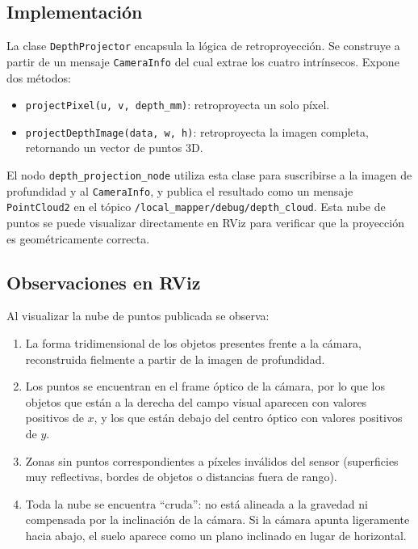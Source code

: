 \subsection{Implementación}

La clase \texttt{DepthProjector} encapsula la lógica de retroproyección.
Se construye a partir de un mensaje \texttt{CameraInfo} del cual extrae
los cuatro intrínsecos. Expone dos métodos:

\begin{itemize}
  \item \texttt{projectPixel(u, v, depth\_mm)}: retroproyecta un solo
        píxel.
  \item \texttt{projectDepthImage(data, w, h)}: retroproyecta la imagen
        completa, retornando un vector de puntos 3D.
\end{itemize}

El nodo \texttt{depth\_projection\_node} utiliza esta clase para suscribirse
a la imagen de profundidad y al \texttt{CameraInfo}, y publica el resultado
como un mensaje \texttt{PointCloud2} en el tópico
\texttt{/local\_mapper/debug/depth\_cloud}. Esta nube de puntos se puede
visualizar directamente en RViz para verificar que la proyección es
geométricamente correcta.

\subsection{Observaciones en RViz}

Al visualizar la nube de puntos publicada se observa:

\begin{enumerate}
  \item La forma tridimensional de los objetos presentes frente a la cámara,
        reconstruida fielmente a partir de la imagen de profundidad.
  \item Los puntos se encuentran en el frame óptico de la cámara, por lo
        que los objetos que están a la derecha del campo visual aparecen
        con valores positivos de $x$, y los que están debajo del centro
        óptico con valores positivos de $y$.
  \item Zonas sin puntos correspondientes a píxeles inválidos del sensor
        (superficies muy reflectivas, bordes de objetos o distancias fuera
        de rango).
  \item Toda la nube se encuentra ``cruda'': no está alineada a la gravedad
        ni compensada por la inclinación de la cámara. Si la cámara apunta
        ligeramente hacia abajo, el suelo aparece como un plano inclinado
        en lugar de horizontal.
\end{enumerate}

